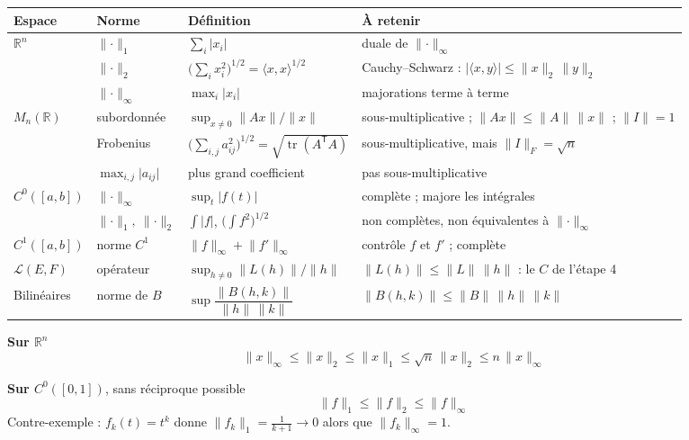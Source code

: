 \documentclass[10pt,a4paper]{article}
\newcommand{\norm}[1]{\lVert #1\rVert}
\newcommand{\abs}[1]{\lvert #1\rvert}
\newcommand{\R}{\mathbb{R}}
\begin{document}
\begin{tcolorbox}[enhanced,colback=white,colframe=bleu!30,boxrule=0.5pt,arc=2pt,left=4pt,right=4pt,top=2pt,bottom=2pt]
\small
\begin{tabularx}{\linewidth}{@{}l l l X@{}}
\toprule
\normalfont\sffamily\bfseries Espace & \sffamily\bfseries Norme & \sffamily\bfseries Définition & \sffamily\bfseries À retenir\\
\midrule
$\R^n$ & $\norm{\cdot}_1$ & $\sum_i\abs{x_i}$ & duale de $\norm{\cdot}_\infty$\\
       & $\norm{\cdot}_2$ & $\bigl(\sum_i x_i^2\bigr)^{1/2}=\langle x,x\rangle^{1/2}$ & Cauchy–Schwarz : $\abs{\langle x,y\rangle}\le\norm{x}_2\,\norm{y}_2$\\
       & $\norm{\cdot}_\infty$ & $\max_i\abs{x_i}$ & majorations terme à terme\\
\midrule
$M_n(\R)$ & subordonnée & $\sup_{x\neq0}\norm{Ax}/\norm{x}$ & sous-multiplicative ; $\norm{Ax}\le\norm{A}\,\norm{x}$ ; $\norm{I}=1$\\
          & Frobenius & $\bigl(\sum_{i,j}a_{ij}^2\bigr)^{1/2}=\sqrt{\operatorname{tr}(A^{\mathsf T}A)}$ & sous-multiplicative, mais $\norm{I}_F=\sqrt n$\\
          & $\max_{i,j}\abs{a_{ij}}$ & plus grand coefficient & \textcolor{rouge}{pas} sous-multiplicative\\
\midrule
$C^0([a,b])$ & $\norm{\cdot}_\infty$ & $\sup_t\abs{f(t)}$ & complète ; majore les intégrales\\
             & $\norm{\cdot}_1,\ \norm{\cdot}_2$ & $\int\abs{f}$, $\bigl(\int f^2\bigr)^{1/2}$ & non complètes, non équivalentes à $\norm{\cdot}_\infty$\\
\midrule
$C^1([a,b])$ & norme $C^1$ & $\norm{f}_\infty+\norm{f'}_\infty$ & contrôle $f$ et $f'$ ; complète\\
\midrule
$\mathcal L(E,F)$ & opérateur & $\sup_{h\neq0}\norm{L(h)}/\norm{h}$ & $\norm{L(h)}\le\norm{L}\,\norm{h}$ : le $C$ de l'étape 4\\
Bilinéaires & norme de $B$ & $\sup\dfrac{\norm{B(h,k)}}{\norm{h}\,\norm{k}}$ & $\norm{B(h,k)}\le\norm{B}\,\norm{h}\,\norm{k}$\\
\bottomrule
\end{tabularx}
\end{tcolorbox}

\begin{minipage}[t]{0.5\linewidth}
\textbf{\sffamily Sur $\R^n$}
\[
\norm{x}_\infty\le\norm{x}_2\le\norm{x}_1\le\sqrt n\,\norm{x}_2\le n\,\norm{x}_\infty
\]
\end{minipage}\hfill
\begin{minipage}[t]{0.46\linewidth}
\textbf{\sffamily Sur $C^0([0,1])$}, sans réciproque possible
\[
\norm{f}_1\le\norm{f}_2\le\norm{f}_\infty
\]
{\small Contre-exemple : $f_k(t)=t^k$ donne $\norm{f_k}_1=\frac1{k+1}\to0$ alors que $\norm{f_k}_\infty=1$.}
\end{minipage}
\end{document}
